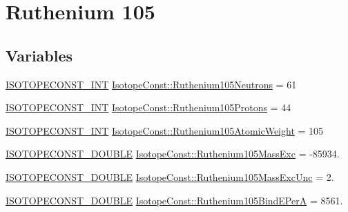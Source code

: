 \hypertarget{group___isotope_const-_ruthenium-_ru105}{}\section{Ruthenium 105}
\label{group___isotope_const-_ruthenium-_ru105}
\subsection*{Variables}
\begin{DoxyCompactItemize}
\item 
\mbox{\hyperlink{group___isotope_const-_macros_ga5f18360b3e99483a35c32d789e62621c}{I\+S\+O\+T\+O\+P\+E\+C\+O\+N\+S\+T\+\_\+\+I\+NT}} \mbox{\hyperlink{group___isotope_const-_ruthenium-_ru105_gaa4eade857a7125cc7b10c8ab762bf13d}{Isotope\+Const\+::\+Ruthenium105\+Neutrons}} = 61
\item 
\mbox{\hyperlink{group___isotope_const-_macros_ga5f18360b3e99483a35c32d789e62621c}{I\+S\+O\+T\+O\+P\+E\+C\+O\+N\+S\+T\+\_\+\+I\+NT}} \mbox{\hyperlink{group___isotope_const-_ruthenium-_ru105_gaade22f3c9036b49f7138a25e45ad38aa}{Isotope\+Const\+::\+Ruthenium105\+Protons}} = 44
\item 
\mbox{\hyperlink{group___isotope_const-_macros_ga5f18360b3e99483a35c32d789e62621c}{I\+S\+O\+T\+O\+P\+E\+C\+O\+N\+S\+T\+\_\+\+I\+NT}} \mbox{\hyperlink{group___isotope_const-_ruthenium-_ru105_ga91b5a8f57fa37818c723c2a01d0c3a9f}{Isotope\+Const\+::\+Ruthenium105\+Atomic\+Weight}} = 105
\item 
\mbox{\hyperlink{group___isotope_const-_macros_ga8f45a7272ce02c0b4c65c44636ed719a}{I\+S\+O\+T\+O\+P\+E\+C\+O\+N\+S\+T\+\_\+\+D\+O\+U\+B\+LE}} \mbox{\hyperlink{group___isotope_const-_ruthenium-_ru105_gab8295c3a3527720838c7fdade6e2cca8}{Isotope\+Const\+::\+Ruthenium105\+Mass\+Exc}} = -\/85934.
\item 
\mbox{\hyperlink{group___isotope_const-_macros_ga8f45a7272ce02c0b4c65c44636ed719a}{I\+S\+O\+T\+O\+P\+E\+C\+O\+N\+S\+T\+\_\+\+D\+O\+U\+B\+LE}} \mbox{\hyperlink{group___isotope_const-_ruthenium-_ru105_ga4f657964f24b6e525ced3766580d3765}{Isotope\+Const\+::\+Ruthenium105\+Mass\+Exc\+Unc}} = 2.
\item 
\mbox{\hyperlink{group___isotope_const-_macros_ga8f45a7272ce02c0b4c65c44636ed719a}{I\+S\+O\+T\+O\+P\+E\+C\+O\+N\+S\+T\+\_\+\+D\+O\+U\+B\+LE}} \mbox{\hyperlink{group___isotope_const-_ruthenium-_ru105_ga7c9a33eeb07916f8192c58c7c8915e53}{Isotope\+Const\+::\+Ruthenium105\+Bind\+E\+PerA}} = 8561.
\item 

\end{DoxyCompactItemize}
